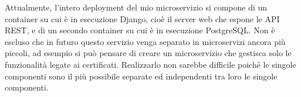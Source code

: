 Attualmente, l'intero deployment del mio microservizio si compone di un container
su cui è in esecuzione Django, cioè il server web che espone le API REST, e
di un secondo container su cui è in esecuzione PostgreSQL.
Non è escluso che in futuro questo servizio venga separato in microservizi
ancora più piccoli, ad esempio si può pensare di creare un microservizio
che gestisca solo le funzionalità legate ai certificati. Realizzarlo non sarebbe
difficile poiché le singole componenti sono il più possibile separate ed independenti
tra loro le singole componenti.


